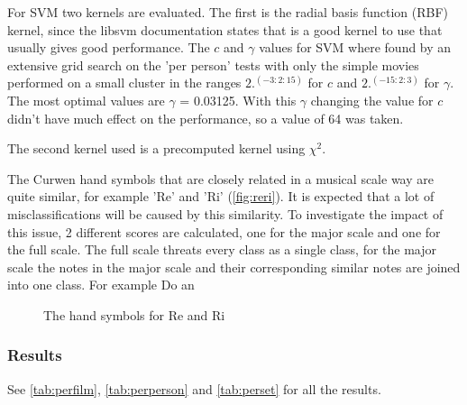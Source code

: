 For SVM two kernels are evaluated. The first is the radial basis function (RBF) kernel, since the libsvm documentation states that is a good kernel to use that usually gives good performance. The $c$ and $\gamma$ values for SVM where found by an extensive grid search on the 'per person' tests with only the simple movies performed on a small cluster in the ranges $2.^(-3:2:15)$ for $c$ and $2.^(-15:2:3)$ for $\gamma$. The most optimal values are $\gamma$ = 0.03125. With this $\gamma$ changing the value for $c$ didn't have much effect on the performance, so a value of 64 was taken.

The second kernel used is a precomputed kernel using $\chi^2$.

The Curwen hand symbols that are closely related in a musical scale way are quite similar, for example 'Re' and 'Ri' (\autoref{fig:reri}). It is expected that a lot of misclassifications will be caused by this similarity. To investigate the impact of this issue, 2 different scores are calculated, one for the major scale and one for the full scale. The full scale threats every class as a single class, for the major scale the notes in the major scale and their corresponding similar notes are joined into one class. For example Do an

\begin{figure}[htbp]
  \centering
{}
\hspace{0.03\linewidth}
  \caption{The hand symbols for Re and Ri}
  \label{fig:reri}
\end{figure}


\subsubsection{Results}
See \autoref{tab:perfilm}, \autoref{tab:perperson} and \autoref{tab:perset} for all the results.

